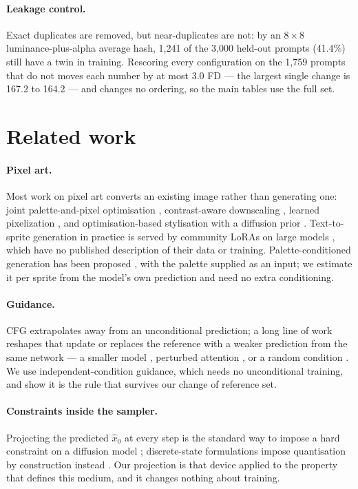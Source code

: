 \documentclass[10pt,twocolumn,letterpaper]{article}
\begin{document}
\paragraph{Leakage control.}
Exact duplicates are removed, but near-duplicates are not: by an $8\times8$ luminance-plus-alpha average hash, 1{,}241
of the 3{,}000 held-out prompts (41.4\%) still have a twin in training. Rescoring every configuration on the 1{,}759
prompts that do not moves each number by at most 3.0 FD --- the largest single change is 167.2 to 164.2 --- and changes
no ordering, so the main tables use the full set.

\section{Related work}
\label{sec:related}

\paragraph{Pixel art.}
Most work on pixel art converts an existing image rather than generating one: joint palette-and-pixel optimisation
\cite{Gerstner2012}, contrast-aware downscaling \cite{PixelOE2024}, learned pixelization \cite{Han2018,Wu2022}, and
optimisation-based stylisation with a diffusion prior \cite{Binninger2024}. Text-to-sprite generation in practice is
served by community LoRAs on large models \cite{PixelArtXL,PixelArtLoRAFlux}, which have no published description of
their data or training. Palette-conditioned generation has been proposed \cite{PixDiffPIG}, with the palette supplied
as an input; we estimate it per sprite from the model's own prediction and need no extra conditioning.

\paragraph{Guidance.}
CFG \cite{HoSalimans2022} extrapolates away from an unconditional prediction; a long line of work reshapes that update
\cite{Kynkaanniemi2024,Sadat2024apg,Sadat2025fdg,Chung2024} or replaces the reference with a weaker prediction from the
same network --- a smaller model \cite{Karras2024}, perturbed attention \cite{Ahn2024,Hong2023}, or a random condition
\cite{Sadat2024icg}. We use independent-condition guidance, which needs no unconditional training, and show it is the
rule that survives our change of reference set.

\paragraph{Constraints inside the sampler.}
Projecting the predicted $\hat x_0$ at every step is the standard way to impose a hard constraint on a diffusion model
\cite{Venkatakrishnan2013,Chung2023dps}; discrete-state formulations impose quantisation by construction instead
\cite{Austin2021,Gu2022vqdiffusion}. Our projection is that device applied to the property that defines this medium,
and it changes nothing about training.
\end{document}
